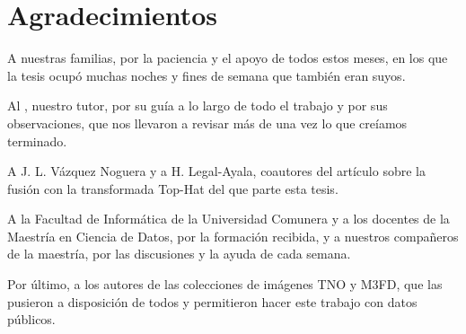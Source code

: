 \chapter*{Agradecimientos}
{}

A nuestras familias, por la paciencia y el apoyo de todos estos meses, en los que la tesis ocupó muchas
noches y fines de semana que también eran suyos.

Al \tutor, nuestro tutor, por su guía a lo largo de todo el trabajo y por sus observaciones, que nos
llevaron a revisar más de una vez lo que creíamos terminado.

A J. L. Vázquez Noguera y a H. Legal-Ayala, coautores del artículo sobre la fusión con la transformada
Top-Hat del que parte esta tesis.

A la Facultad de Informática de la Universidad Comunera y a los docentes de la Maestría en Ciencia de
Datos, por la formación recibida, y a nuestros compañeros de la maestría, por las discusiones y la ayuda
de cada semana.

Por último, a los autores de las colecciones de imágenes TNO y M3FD, que las pusieron a disposición de
todos y permitieron hacer este trabajo con datos públicos.
